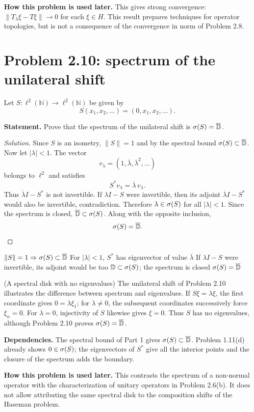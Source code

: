\noindent\textbf{How this problem is used later.} This gives strong convergence: $\|T_\lambda\xi-T\xi\|\to0$ for each $\xi\in H$. This result prepares techniques for operator topologies, but is not a consequence of the convergence in norm of Problem 2.8.

\section{Problem 2.10: spectrum of the unilateral shift}


Let $S:\ell^2(\mathbb N)\to\ell^2(\mathbb N)$ be given by
\[
S(x_1,x_2,\dots)=(0,x_1,x_2,\dots).
\]

\noindent\textbf{Statement.} Prove that the spectrum of the unilateral shift is $\sigma(S)=\overline{\mathbb D}$.

\begin{proof}[Solution]
Since $S$ is an isometry, $\|S\|=1$ and by the spectral bound
$\sigma(S)\subset\overline{\mathbb D}$. Now let $|\lambda|<1$. The vector
\[
 v_\lambda=(1,\overline\lambda,\overline\lambda^2,\ldots)
\]
belongs to $\ell^2$ and satisfies
\[
 S^*v_\lambda=\overline\lambda\,v_\lambda.
\]
Thus $\overline\lambda I-S^*$ is not invertible. If $\lambda I-S$ were invertible, then its
adjoint $\overline\lambda I-S^*$ would also be invertible, contradiction. Therefore
$\lambda\in\sigma(S)$ for all $|\lambda|<1$. Since the spectrum is closed,
$\overline{\mathbb D}\subset\sigma(S)$. Along with the opposite inclusion,
\[
 \sigma(S)=\overline{\mathbb D}.
\]
\end{proof}

\proofdiagrambranch
{$\|S\|=1\Rightarrow\sigma(S)\subset\overline{\mathbb D}$}
{For $|\lambda|<1$, $S^*$ has eigenvector of value $\overline\lambda$}
{If $\lambda I-S$ were invertible, its adjoint would be too}
{$\mathbb D\subset\sigma(S)$; the spectrum is closed}
{$\sigma(S)=\overline{\mathbb D}$}

\begin{cthejemplo}{(A spectral disk with no eigenvalues)}
The unilateral shift of Problem 2.10 illustrates the difference between spectrum and eigenvalues.
If $S\xi=\lambda\xi$, the first coordinate gives $0=\lambda\xi_1$; for
$\lambda\ne0$, the subsequent coordinates successively force $\xi_n=0$.
For $\lambda=0$, injectivity of $S$ likewise gives $\xi=0$.
Thus $S$ has no eigenvalues, although Problem 2.10 proves
$\sigma(S)=\overline{\mathbb D}$.
\end{cthejemplo}

\noindent\textbf{Dependencies.} The spectral bound of Part 1 gives $\sigma(S)\subset\overline{\mathbb D}$. Problem 1.11(d) already shows $0\in\sigma(S)$; the eigenvectors of $S^*$ give all the interior points and the closure of the spectrum adds the boundary.

\noindent\textbf{How this problem is used later.} This contrasts the spectrum of a non-normal operator with the characterization of unitary operators in Problem 2.6(b). It does not allow attributing the same spectral disk to the composition shifts of the Haseman problem.
